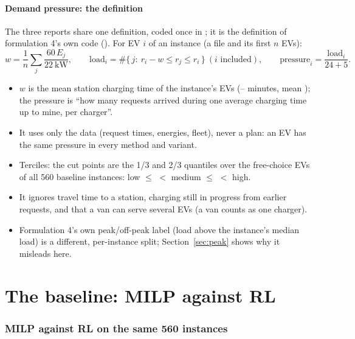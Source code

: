 \subsection{Demand pressure: the definition}\label{sec:pressdef}
The three reports share one definition, coded once in ; it is the definition of formulation 4's own code (). For EV $i$ of an instance (a file and its first $n$ EVs):
\[
w=\frac{1}{n}\sum_{j}\frac{60\,E_j}{22\ \text{kW}},\qquad
\text{load}_i=\#\{\,j:\ r_i-w\le r_j\le r_i\,\}\ (i\text{ included}),\qquad
\text{pressure}_i=\frac{\text{load}_i}{24+5}.
\]
\begin{itemize}
  \item $w$ is the mean station charging time of the instance's EVs (\PressWindowMin--\PressWindowMax{} minutes, mean \PressWindowMean); the pressure is ``how many requests arrived during one average charging time up to mine, per charger''.
  \item It uses only the data (request times, energies, fleet), never a plan: an EV has the same pressure in every method and variant.
  \item Terciles: the cut points are the 1/3 and 2/3 quantiles over the \PressEVs{} free-choice EVs of all 560 baseline instances: low $\le$ \PressLowCut{} $<$ medium $\le$ \PressHighCut{} $<$ high.
  \item It ignores travel time to a station, charging still in progress from earlier requests, and that a van can serve several EVs (a van counts as one charger).
  \item Formulation 4's own peak/off-peak label (load above the instance's median load) is a different, per-instance split; Section~\ref{sec:peak} shows why it misleads here.
\end{itemize}

\part{The baseline: MILP against RL}
\section{MILP against RL on the same 560 instances}


